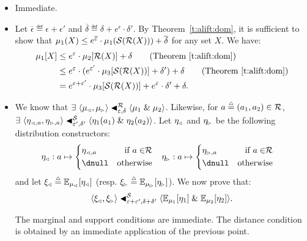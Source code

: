 \documentclass{lmcs}
\begin{document}
\proofatend\strut{}
\begin{itemize}
  \item Immediate.

  \item
  Let
  $\overline{\epsilon} \eqdef \epsilon + \epsilon'$ and
  $\overline{\delta} \eqdef  \delta+ e^\epsilon \cdot\delta'$.
  By Theorem~\ref{t:alift:dom}, it is sufficient to show that
  $\mu_1(X) \leq e^{\overline{\epsilon}} \cdot
     \mu_1(\oS (\oR (X))) + \overline{\delta}$
  for any set $X$. We have:
  \begin{align*}
    \mu_1[X]
      &\leq e^\epsilon \cdot \mu_2[\oR(X)] + \delta 
        \tag{Theorem \ref{t:alift:dom}} \\
      &\leq e^\epsilon \cdot (%
          e^{\epsilon'} \cdot \mu_3[\oS(\oR(X))] + \delta')
        + \delta
        \tag{Theorem \ref{t:alift:dom}} \\
      &= e^{\epsilon + \epsilon'} \cdot \mu_3[\oS(\oR(X))]
         + e^{\epsilon} \cdot \delta' + \delta .
  \end{align*}

  \item
  We know that
  $\exists\ \dalifted {\mu\lside} {\mu\rside}
     \epsilon \delta {\rR} {\mu_1} {\mu_2}$.
  Likewise, for $a \eqdef (a_1, a_2) \in \oR$,
  $\exists\ \dalifted {\eta_{\lmark,a}} {\eta_{\rmark,a}}
     {\epsilon'} {\delta'} {\rS} {\eta_1(a_1)} {\eta_2(a_2)}$.
  Let $\eta\lside$ and $\eta\rside$ be the following distribution
  constructors:
  \begin{align*}
    \eta\lside : a & \mapsto \left\{
      \begin{aligned}
        &\eta_{\lmark,a} & \text{if $a \in \rR$} \\
        &\dnull & \text{otherwise}
      \end{aligned} \right. &
    \eta\rside : a & \mapsto \left\{
      \begin{aligned}
        &\eta_{\rmark,a} & \text{if $a \in \rR$} \\
        &\dnull & \text{otherwise}
      \end{aligned} \right. &
  \end{align*}
  and let
  $\xi\lside \eqdef \sE {\mu\lside} {\eta\lside}$
  (resp. $\xi\rside \eqdef \sE {\mu\rside} {\eta\rside}$).
  We now prove that:
  \[ \dalifted {\xi\lside} {\xi\rside}
     {\epsilon+\epsilon'} {\delta+\delta'} {\rS}
     {\sE {\mu_1} {\eta_1}} {\sE {\mu_2} {\eta_2}} . \]

  The marginal and support conditions are immediate. The distance
  condition is obtained by an immediate application of the previous
  point. \qedhere
\end{itemize}
\endproofatend
\end{document}
